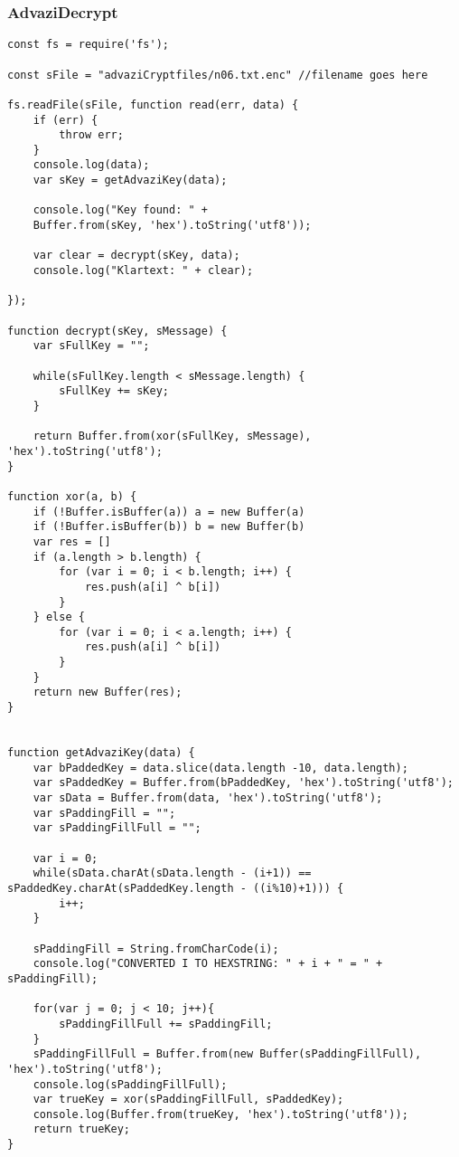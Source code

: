\documentclass[12pt]{article}
\theoremstyle{plain}
\begin{document}
\subsubsection{AdvaziDecrypt}
\begin{lstlisting}
const fs = require('fs');

const sFile = "advaziCryptfiles/n06.txt.enc" //filename goes here

fs.readFile(sFile, function read(err, data) {
	if (err) {
		throw err;
	}
	console.log(data);
	var sKey = getAdvaziKey(data);

	console.log("Key found: " +
	Buffer.from(sKey, 'hex').toString('utf8'));

	var clear = decrypt(sKey, data);
	console.log("Klartext: " + clear);

});

function decrypt(sKey, sMessage) {
	var sFullKey = "";

	while(sFullKey.length < sMessage.length) {
		sFullKey += sKey;
	}

	return Buffer.from(xor(sFullKey, sMessage), 'hex').toString('utf8');
}

function xor(a, b) {
	if (!Buffer.isBuffer(a)) a = new Buffer(a)
	if (!Buffer.isBuffer(b)) b = new Buffer(b)
	var res = []
	if (a.length > b.length) {
		for (var i = 0; i < b.length; i++) {
			res.push(a[i] ^ b[i])
		}
	} else {
		for (var i = 0; i < a.length; i++) {
			res.push(a[i] ^ b[i])
		}
	}
	return new Buffer(res);
}


function getAdvaziKey(data) {
	var bPaddedKey = data.slice(data.length -10, data.length);
	var sPaddedKey = Buffer.from(bPaddedKey, 'hex').toString('utf8');
	var sData = Buffer.from(data, 'hex').toString('utf8');
	var sPaddingFill = "";
	var sPaddingFillFull = "";

	var i = 0;
	while(sData.charAt(sData.length - (i+1)) == sPaddedKey.charAt(sPaddedKey.length - ((i%10)+1))) {
		i++;
	}

	sPaddingFill = String.fromCharCode(i);
	console.log("CONVERTED I TO HEXSTRING: " + i + " = " + sPaddingFill);
	
	for(var j = 0; j < 10; j++){
		sPaddingFillFull += sPaddingFill;
	}
	sPaddingFillFull = Buffer.from(new Buffer(sPaddingFillFull), 'hex').toString('utf8');
	console.log(sPaddingFillFull);
	var trueKey = xor(sPaddingFillFull, sPaddedKey);
	console.log(Buffer.from(trueKey, 'hex').toString('utf8'));
	return trueKey;
}

\end{lstlisting}
\end{document}
